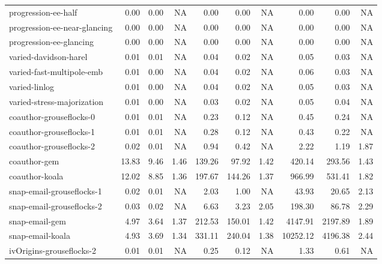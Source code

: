\begin{tabular}{l|rrr|rrr|rrr}
            progression-ee-half &   0.00 &  0.00 &       NA &   0.00 &   0.00 &       NA &     0.00 &    0.00 &    NA \\
   progression-ee-near-glancing &   0.00 &  0.00 &       NA &   0.00 &   0.00 &       NA &     0.00 &    0.00 &    NA \\
        progression-ee-glancing &   0.00 &  0.00 &       NA &   0.00 &   0.00 &       NA &     0.00 &    0.00 &    NA \\
          varied-davidson-harel &   0.01 &  0.01 &       NA &   0.04 &   0.02 &       NA &     0.05 &    0.03 &    NA \\
      varied-fast-multipole-emb &   0.01 &  0.00 &       NA &   0.04 &   0.02 &       NA &     0.06 &    0.03 &    NA \\
                  varied-linlog &   0.01 &  0.00 &       NA &   0.04 &   0.02 &       NA &     0.05 &    0.03 &    NA \\
     varied-stress-majorization &   0.01 &  0.00 &       NA &   0.03 &   0.02 &       NA &     0.05 &    0.04 &    NA \\
        coauthor-grouseflocks-0 &   0.01 &  0.01 &       NA &   0.23 &   0.12 &       NA &     0.45 &    0.24 &    NA \\
        coauthor-grouseflocks-1 &   0.01 &  0.01 &       NA &   0.28 &   0.12 &       NA &     0.43 &    0.22 &    NA \\
        coauthor-grouseflocks-2 &   0.02 &  0.01 &       NA &   0.94 &   0.42 &       NA &     2.22 &    1.19 &  1.87 \\
                   coauthor-gem &  13.83 &  9.46 &     1.46 & 139.26 &  97.92 &     1.42 &   420.14 &  293.56 &  1.43 \\
                 coauthor-koala &  12.02 &  8.85 &     1.36 & 197.67 & 144.26 &     1.37 &   966.99 &  531.41 &  1.82 \\
      snap-email-grouseflocks-1 &   0.02 &  0.01 &       NA &   2.03 &   1.00 &       NA &    43.93 &   20.65 &  2.13 \\
      snap-email-grouseflocks-2 &   0.03 &  0.02 &       NA &   6.63 &   3.23 &     2.05 &   198.30 &   86.78 &  2.29 \\
                 snap-email-gem &   4.97 &  3.64 &     1.37 & 212.53 & 150.01 &     1.42 &  4147.91 & 2197.89 &  1.89 \\
               snap-email-koala &   4.93 &  3.69 &     1.34 & 331.11 & 240.04 &     1.38 & 10252.12 & 4196.38 &  2.44 \\
       ivOrigins-grouseflocks-2 &   0.01 &  0.01 &       NA &   0.25 &   0.12 &       NA &     1.33 &    0.61 &    NA \\

\end{tabular}
